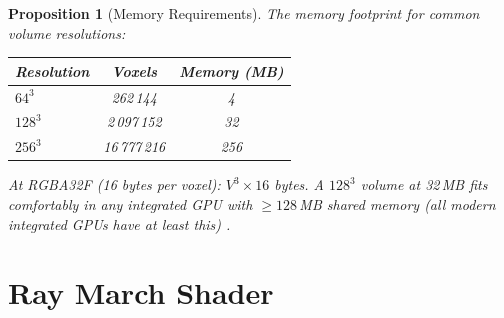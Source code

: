 \documentclass[11pt,twocolumn,a4paper]{article}
\newtheorem{proposition}[theorem]{Proposition}
\begin{document}
\begin{proposition}[Memory Requirements]
\label{prop:memory}
The memory footprint for common volume resolutions:
\begin{center}
\small
\begin{tabular}{@{}lcc@{}}
\toprule
\textbf{Resolution} & \textbf{Voxels} & \textbf{Memory (MB)} \\
\midrule
$64^3$ & 262\,144 & 4 \\
$128^3$ & 2\,097\,152 & 32 \\
$256^3$ & 16\,777\,216 & 256 \\
\bottomrule
\end{tabular}
\end{center}
At RGBA32F (16 bytes per voxel): $V^3 \times 16$ bytes. A $128^3$
volume at 32\,MB fits comfortably in any integrated GPU with $\geq
128$\,MB shared memory (all modern integrated GPUs have at least
this) \citep{owens2008}.
\end{proposition}


\section{Ray March Shader}
\label{sec:ray-march}
\end{document}
